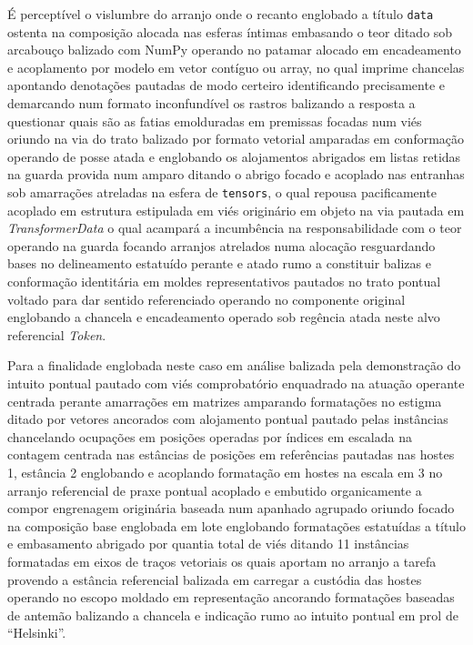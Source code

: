 \documentclass[
  brazilian,
]{article}
\begin{document}
É perceptível o vislumbre do arranjo onde o recanto englobado a título
\texttt{data} ostenta na composição alocada nas esferas íntimas
embasando o teor ditado sob arcabouço balizado com NumPy operando no
patamar alocado em encadeamento e acoplamento por modelo em vetor
contíguo ou array, no qual imprime chancelas apontando denotações
pautadas de modo certeiro identificando precisamente e demarcando num
formato inconfundível os rastros balizando a resposta a questionar quais
são as fatias emolduradas em premissas focadas num viés oriundo na via
do trato balizado por formato vetorial amparadas em conformação operando
de posse atada e englobando os alojamentos abrigados em listas retidas
na guarda provida num amparo ditando o abrigo focado e acoplado nas
entranhas sob amarrações atreladas na esfera de \texttt{tensors}, o qual
repousa pacificamente acoplado em estrutura estipulada em viés
originário em objeto na via pautada em \emph{TransformerData} o qual
acampará a incumbência na responsabilidade com o teor operando na guarda
focando arranjos atrelados numa alocação resguardando bases no
delineamento estatuído perante e atado rumo a constituir balizas e
conformação identitária em moldes representativos pautados no trato
pontual voltado para dar sentido referenciado operando no componente
original englobando a chancela e encadeamento operado sob regência atada
neste alvo referencial \emph{Token}.

Para a finalidade englobada neste caso em análise balizada pela
demonstração do intuito pontual pautado com viés comprobatório
enquadrado na atuação operante centrada perante amarrações em matrizes
amparando formatações no estigma ditado por vetores ancorados com
alojamento pontual pautado pelas instâncias chancelando ocupações em
posições operadas por índices em escalada na contagem centrada nas
estâncias de posições em referências pautadas nas hostes 1, estância 2
englobando e acoplando formatação em hostes na escala em 3 no arranjo
referencial de praxe pontual acoplado e embutido organicamente a compor
engrenagem originária baseada num apanhado agrupado oriundo focado na
composição base englobada em lote englobando formatações estatuídas a
título e embasamento abrigado por quantia total de viés ditando 11
instâncias formatadas em eixos de traços vetoriais os quais aportam no
arranjo a tarefa provendo a estância referencial balizada em carregar a
custódia das hostes operando no escopo moldado em representação
ancorando formatações baseadas de antemão balizando a chancela e
indicação rumo ao intuito pontual em prol de ``Helsinki''.
\end{document}
